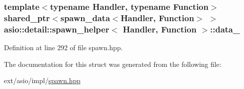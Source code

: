 \subsubsection[{data\+\_\+}]{\setlength{\rightskip}{0pt plus 5cm}template$<$typename Handler, typename Function$>$ shared\+\_\+ptr$<${\bf spawn\+\_\+data}$<$Handler, Function$>$ $>$ {\bf asio\+::detail\+::spawn\+\_\+helper}$<$ Handler, Function $>$\+::data\+\_\+}\label{structasio_1_1detail_1_1spawn__helper_a9905b71df2ab1fad3d13f9396d72506d}


Definition at line 292 of file spawn.\+hpp.



The documentation for this struct was generated from the following file\+:\begin{DoxyCompactItemize}
\item 
ext/asio/impl/\hyperlink{impl_2spawn_8hpp}{spawn.\+hpp}\end{DoxyCompactItemize}
